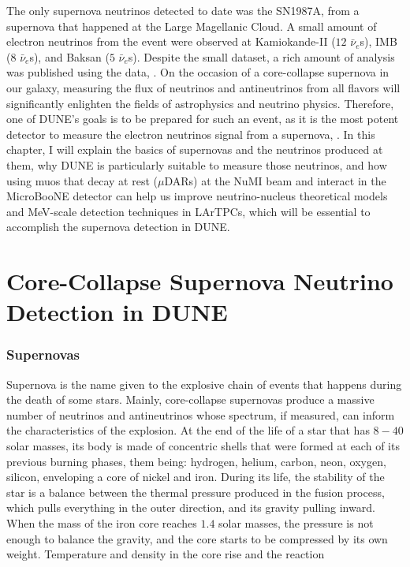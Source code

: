 The only supernova neutrinos detected to date was the SN1987A, from a supernova that happened at the Large Magellanic Cloud. A small amount of electron neutrinos from the event were observed at Kamiokande-II ($12$ $\bar{\nu}_e$s), IMB ($8$ $\bar{\nu}_e$s), and Baksan ($5$ $\bar{\nu}_e$s). Despite the small dataset, a rich amount of analysis was published using the data, \cite{Kamiokande-II-PRL, Kamiokande-II-PRD, IMB, Baksan}. 
 On the occasion of a core-collapse supernova in our galaxy, measuring the flux of neutrinos and antineutrinos from all flavors will significantly enlighten the fields of astrophysics and neutrino physics. Therefore, one of DUNE's goals is to be prepared for such an event, as it is the most potent detector to measure the electron neutrinos signal from a supernova, \cite{dune_SAND}.
 In this chapter, I will explain the basics of supernovas and the neutrinos produced at them, why DUNE is particularly suitable to measure those neutrinos, and how using muos that decay at rest ($\mu$DARs) at the NuMI beam and interact in the MicroBooNE detector can help us improve neutrino-nucleus theoretical models and MeV-scale detection techniques in LArTPCs, which will be essential to accomplish the supernova detection in DUNE. 

\section{Core-Collapse Supernova Neutrino Detection in DUNE}
\subsubsection{Supernovas}
Supernova is the name given to the explosive chain of events that happens during the death of some stars. Mainly, core-collapse supernovas produce a massive number of neutrinos and antineutrinos whose spectrum, if measured, can inform the characteristics of the explosion. 
At the end of the life of a star that has $8-40$ solar masses, its body is made of concentric shells that were formed at each of its previous burning phases, them being: hydrogen, helium, carbon, neon, oxygen, silicon, enveloping a core of nickel and iron. During its life, the stability of the star is a balance between the thermal pressure produced in the fusion process, which pulls everything in the outer direction, and its gravity pulling inward. When the mass of the iron core reaches $1.4$ solar masses, the pressure is not enough to balance the gravity, and the core starts to be compressed by its own weight. Temperature and density in the core rise and the reaction

